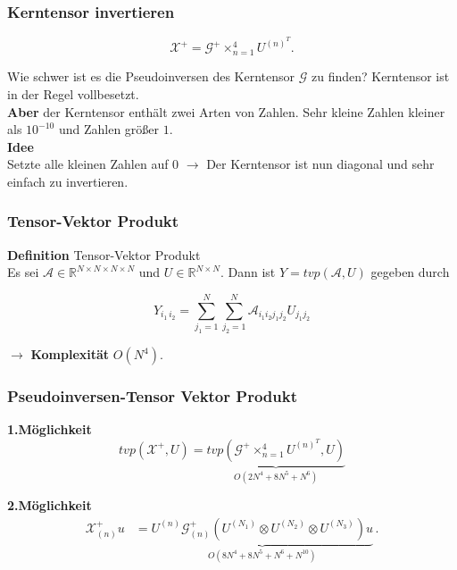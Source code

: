 \begin{frame}
\frametitle{Kerntensor invertieren}
\begin{framed}
\begin{equation*}
\pmb{\mathcal{X}}^{+} = \pmb{\mathcal{G}}^{+} \times_{n=1}^{4} U^{ (n) ^{T} }.
\end{equation*}
\end{framed}

Wie schwer ist es die Pseudoinversen des Kerntensor $\mathcal{G}$ zu finden?
Kerntensor ist in der Regel vollbesetzt. \\ \textbf{Aber} der Kerntensor enthält zwei Arten von Zahlen. Sehr kleine Zahlen kleiner als $10^{-10}$ und Zahlen größer $1$. \\
\textbf{Idee} \\
Setzte alle kleinen Zahlen auf 0 $\rightarrow$ Der Kerntensor ist nun diagonal und sehr einfach zu invertieren.

\end{frame}

\begin{frame}
\frametitle{Tensor-Vektor Produkt}
\begin{framed}
\textbf{Definition} Tensor-Vektor Produkt \\
Es sei $\mathcal{A} \in \mathbb{R}^{N \times N \times N \times N}$ und $U \in \mathbb{R}^{N \times N}$.
Dann ist $Y=tvp(\mathcal{A},U)$ gegeben durch


\begin{equation*}
Y_{i_1 \, i_2} = \sum\limits_{j_1=1}^{N} \sum\limits_{j_2=1}^{N} \mathcal{A}_{i_1 i_2 j_1 j_2} U_{j_1 j_2}
\end{equation*}

\end{framed}

$\rightarrow$ \textbf{Komplexität} $O(N^4)$.

\end{frame}

\begin{frame}
\frametitle{Pseudoinversen-Tensor Vektor Produkt}
\textbf{1.Möglichkeit}
\begin{equation*} \label{eq:pinv}
tvp(\mathcal{X}^{+},U) = \underbrace{tvp(\mathcal{G}^{+} \times_{n=1}^{4} U^{ (n) ^{T} },U)}_{O(2N^4+8N^5+N^6)}
\end{equation*} 


\textbf{2.Möglichkeit}
\begin{equation*} \label{eq:pinvcase}
\begin{aligned}
\mathcal{X}^{+}_{(n)} u&= \underbrace{U^{ (n) }  \mathcal{G}^{+}_{(n)} ( U^{ (N_{1})  } \otimes U^{ (N_{2}) }  \otimes U^{ (N_{3}) }) u}_{O(8N^4+8N^5+N^6+N^{10})} \,.
\end{aligned}
\end{equation*}

\end{frame}


